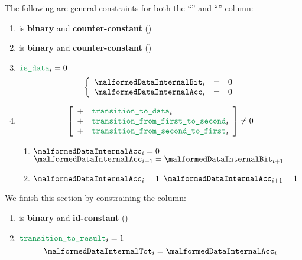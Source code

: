 The following are general constraints for both the ``'' and ``'' column:
\begin{enumerate}
    \item \malformedDataInternalBit{} is \textbf{binary} and \textbf{counter-constant} \quad (\trash)
    \item \malformedDataInternalAcc{} is \textbf{binary} and \textbf{counter-constant} \quad (\trash)
    \item \If $\locIsData _{i} = 0$ \Then
        \[
            \left\{ \begin{array}{lclr}
                \malformedDataInternalBit _{i} & = & 0 \\
                \malformedDataInternalAcc _{i} & = & 0 \\
            \end{array} \right.
        \]
    \item \If
        \[
            \left[ \begin{array}{cl}
                + & \locTransitionToData            _{i} \\
                + & \locTransitionFromFirstToSecond _{i} \\
                + & \locTransitionFromSecondToFirst _{i} \\
            \end{array} \right]
            \neq 0
        \]
        \Then
        \begin{enumerate}
            \item \If $\malformedDataInternalAcc _{i} = 0$ \Then $\malformedDataInternalAcc _{i+1} = \malformedDataInternalBit_ {i+1}$
            \item \If $\malformedDataInternalAcc _{i} = 1$ \Then $\malformedDataInternalAcc _{i+1} = 1$
        \end{enumerate}
\end{enumerate}
We finish this section by constraining the \malformedDataInternalTot{} column:
\begin{enumerate}[resume]
    \item \malformedDataInternalTot{} is \textbf{binary} and \textbf{id-constant} \quad (\trash)
    \item \If $\locTransitionToResult _{i} = 1$ \Then
        \[
            \malformedDataInternalTot _{i} = \malformedDataInternalAcc _{i}
        \]
\end{enumerate}
